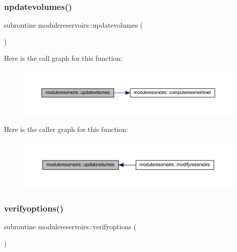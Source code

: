 \subsubsection{\texorpdfstring{updatevolumes()}{updatevolumes()}}
{\footnotesize\ttfamily subroutine modulereservoirs\+::updatevolumes (\begin{DoxyParamCaption}{ }\end{DoxyParamCaption})\hspace{0.3cm}{\ttfamily [private]}}

Here is the call graph for this function\+:\nopagebreak
\begin{figure}[H]
\begin{center}
\leavevmode
\includegraphics[width=350pt]{namespacemodulereservoirs_a2af994aa3f7d8318c768f2960bb34e06_cgraph}
\end{center}
\end{figure}
Here is the caller graph for this function\+:\nopagebreak
\begin{figure}[H]
\begin{center}
\leavevmode
\includegraphics[width=350pt]{namespacemodulereservoirs_a2af994aa3f7d8318c768f2960bb34e06_icgraph}
\end{center}
\end{figure}
\mbox{\label{namespacemodulereservoirs_af13cf54fd0c086fab90e6f36d294bc57}} 
\subsubsection{\texorpdfstring{verifyoptions()}{verifyoptions()}}
{\footnotesize\ttfamily subroutine modulereservoirs\+::verifyoptions (\begin{DoxyParamCaption}{ }\end{DoxyParamCaption})\hspace{0.3cm}{\ttfamily [private]}}

